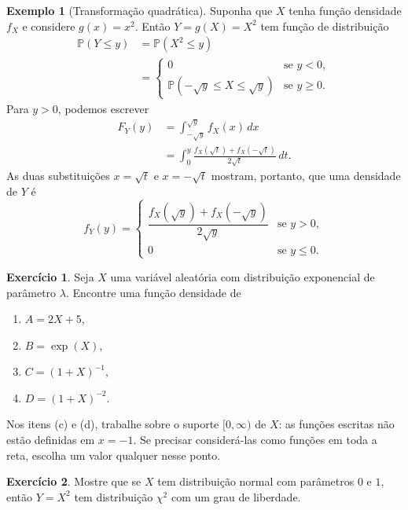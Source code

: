 \documentclass[12pt,portuguese]{article}
\theoremstyle{definition}
\newtheorem{example}[example]{Exemplo}
\theoremstyle{plainexercise}
\newtheorem{exercise}{Exercício}
\theoremstyle{starredexercise}
\theoremstyle{definition}
\begin{document}
\begin{example}[Transformação quadrática]\label{ex:transformacao-quadratica}
Suponha que $X$ tenha função densidade $f_X$ e considere
$g(x) = x^2$. Então $Y = g(X) = X^2$ tem função de distribuição
\[
\begin{aligned}
\mathbb{P}(Y \leqslant y) &= \mathbb{P}(X^2 \leqslant y) \\
&= 
\begin{cases} 0 & \text{se } y < 0, \\[0.3cm] 
\mathbb{P}(-\sqrt{y} \leqslant X \leqslant \sqrt{y}) & \text{se } y \geqslant 0.
\end{cases}
\end{aligned}
\]
Para $y>0$, podemos escrever
\[
\begin{aligned}
F_Y(y)
&=\int_{-\sqrt{y}}^{\sqrt{y}} f_X(x)\,dx
\\[0.3cm]
&=\int_0^y \frac{f_X(\sqrt{t})+f_X(-\sqrt{t})}{2\sqrt{t}}\,dt.
\end{aligned}
\]
As duas substituições $x=\sqrt{t}$ e $x=-\sqrt{t}$ mostram, portanto,
que uma densidade de $Y$ é
\[
f_Y(y)=
\begin{cases}
\dfrac{f_X(\sqrt{y})+f_X(-\sqrt{y})}{2\sqrt{y}}
&\text{se } y>0,\\[0.3cm]
0 &\text{se } y\leqslant 0.
\end{cases}
\]
\end{example}

\begin{exercise}\label{exercise:densidades-exponencial}
  Seja $X$ uma variável aleatória com distribuição exponencial de
  parâmetro $\lambda$. Encontre uma função densidade de
  \begin{enumerate}[label=(\alph*)]
    \item $A = 2X + 5$,
    \item $B = \exp(X)$,
    \item $C = (1 + X)^{-1}$,
    \item $D = (1 + X)^{-2}$.
  \end{enumerate}
  Nos itens (c) e (d), trabalhe sobre o suporte $[0,\infty)$ de $X$:
  as funções escritas não estão definidas em $x=-1$. Se precisar
  considerá-las como funções em toda a reta, escolha um valor qualquer
  nesse ponto.
\end{exercise}

\begin{exercise}\label{exercise:normal-qui-quadrado}
  Mostre que se $X$ tem distribuição normal com parâmetros $0$ e
  $1$, então $Y = X^2$ tem distribuição $\chi^2$ com um grau de
  liberdade.
\end{exercise}
\end{document}
